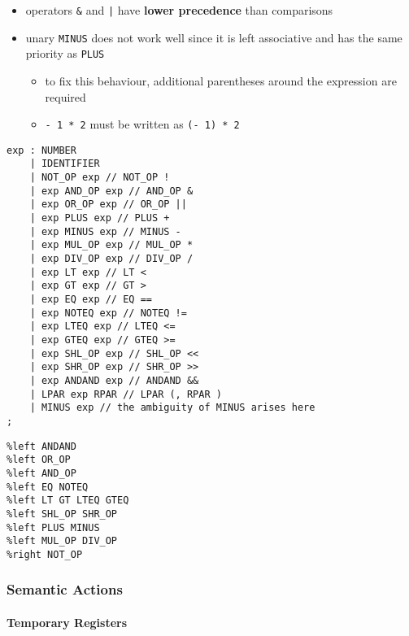 \documentclass[english]{article}
\begin{document}
\begin{itemize}
  \item operators \texttt{\&} and \texttt{|} have \textbf{lower precedence} than comparisons
  \item unary \texttt{MINUS} does not work well since it is left associative and has the same priority as \texttt{PLUS}
        \begin{itemize}
          \item to fix this behaviour, additional parentheses around the expression are required
          \item \texttt{- 1 * 2} must be written as \texttt{(- 1) * 2}
        \end{itemize}
\end{itemize}

\begin{onepage}
  \begin{lstlisting}[language=LANCE, caption={Expression grammar}, label={code:expression-grammar}]
exp : NUMBER
    | IDENTIFIER
    | NOT_OP exp // NOT_OP !
    | exp AND_OP exp // AND_OP &
    | exp OR_OP exp // OR_OP ||
    | exp PLUS exp // PLUS +
    | exp MINUS exp // MINUS -
    | exp MUL_OP exp // MUL_OP *
    | exp DIV_OP exp // DIV_OP /
    | exp LT exp // LT <
    | exp GT exp // GT >
    | exp EQ exp // EQ ==
    | exp NOTEQ exp // NOTEQ !=
    | exp LTEQ exp // LTEQ <=
    | exp GTEQ exp // GTEQ >=
    | exp SHL_OP exp // SHL_OP <<
    | exp SHR_OP exp // SHR_OP >>
    | exp ANDAND exp // ANDAND &&
    | LPAR exp RPAR // LPAR (, RPAR )
    | MINUS exp // the ambiguity of MINUS arises here
;
\end{lstlisting}
\end{onepage}

\begin{onepage}
  \begin{lstlisting}[language=LANCE, caption={Expression precedence}, label={code:expression-precedence}]
%left OROR
%left ANDAND
%left OR_OP
%left AND_OP
%left EQ NOTEQ
%left LT GT LTEQ GTEQ
%left SHL_OP SHR_OP
%left PLUS MINUS
%left MUL_OP DIV_OP
%right NOT_OP
\end{lstlisting}
\end{onepage}

\subsubsection{Semantic Actions}

\paragraph{Temporary Registers}
\end{document}
